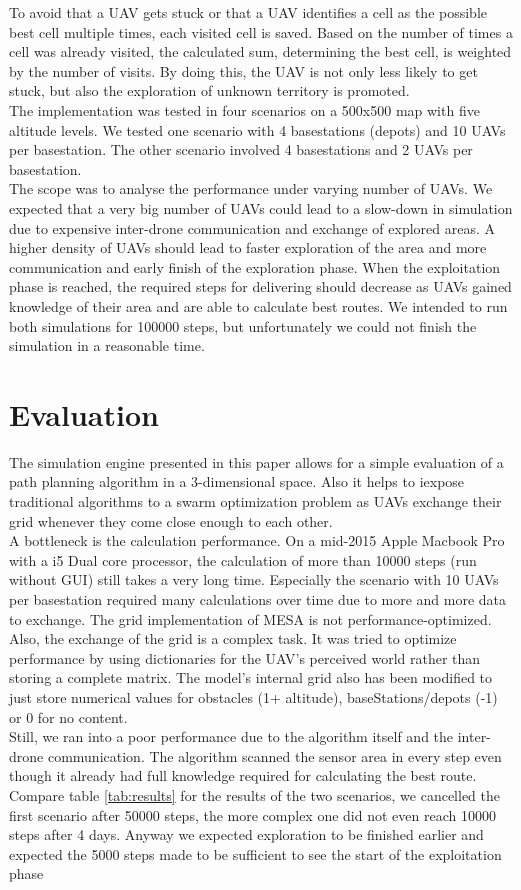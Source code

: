 To avoid that a UAV gets stuck or that a UAV identifies a cell as the possible best cell multiple times, each visited cell is saved. Based on the number of times a cell was already visited, the calculated sum, determining the best cell, is weighted by the number of visits. By doing this, the UAV is not only less likely to get stuck, but also the exploration of unknown territory is promoted.\\
The implementation was tested in four scenarios on a 500x500 map with five altitude levels. We tested one scenario with 4 basestations (depots) and 10 UAVs per basestation. The other scenario involved 4 basestations and 2 UAVs per basestation. \\
The scope was to analyse the performance under varying number of UAVs. We expected that a very big number of UAVs could lead to a slow-down in simulation due to expensive inter-drone communication and exchange of explored areas. A higher density of UAVs should lead to faster exploration of the area and more communication and early finish of the exploration phase. When the exploitation phase is reached, the required steps for delivering should decrease as UAVs gained knowledge of their area and are able to calculate best routes. We intended to run both simulations for 100000 steps, but unfortunately we could not finish the simulation in a reasonable time.

\section{Evaluation}\label{sec:evaluation}
The simulation engine presented in this paper allows for a simple evaluation of a path planning algorithm in a 3-dimensional space. Also it helps to iexpose traditional algorithms to a swarm optimization problem as UAVs exchange their grid whenever they come close enough to each other.\\
A bottleneck is the calculation performance. On a mid-2015 Apple Macbook Pro with a i5 Dual core processor, the calculation of more than 10000 steps (run without GUI) still takes a very long time. Especially the scenario with 10 UAVs per basestation required many calculations over time due to more and more data to exchange. 
  The grid implementation of MESA is not performance-optimized. Also, the exchange of the grid is a complex task. It was tried to optimize performance by using dictionaries for the UAV's perceived world rather than storing a complete matrix. The model's internal grid also has been modified to just store numerical values for obstacles (1+ altitude), baseStations/depots (-1) or 0 for no content.\\
  Still, we ran into a poor performance due to the algorithm itself and the inter-drone communication. The algorithm scanned the sensor area in every step even though it already had full knowledge required for calculating the best route.  Compare table \ref{tab:results} for the results of the two scenarios, we cancelled the first scenario after 50000 steps, the more complex one did not even reach 10000 steps after 4 days. Anyway we expected exploration to be finished earlier and expected the 5000 steps made to be sufficient to see the start of the exploitation phase
 
